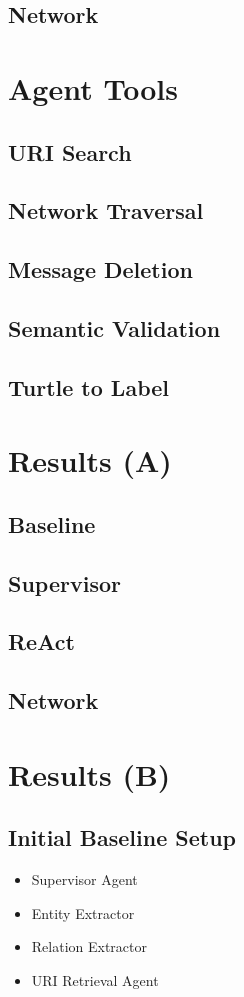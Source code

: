 \documentclass[a4paper,oneside,bibliography=totoc]{scrbook}
\begin{document}
\subsection{Network}

\section{Agent Tools}
\subsection{URI Search}
\subsection{Network Traversal}
\subsection{Message Deletion}
\subsection{Semantic Validation}
\subsection{Turtle to Label}

\section{Results (A)}
\subsection{Baseline}
\subsection{Supervisor}
\subsection{ReAct}
\subsection{Network}

\section{Results (B)}
\subsection{Initial Baseline Setup}
\begin{itemize}
  \item Supervisor Agent
  \item Entity Extractor
  \item Relation Extractor
  \item URI Retrieval Agent
\end{itemize}
\end{document}
